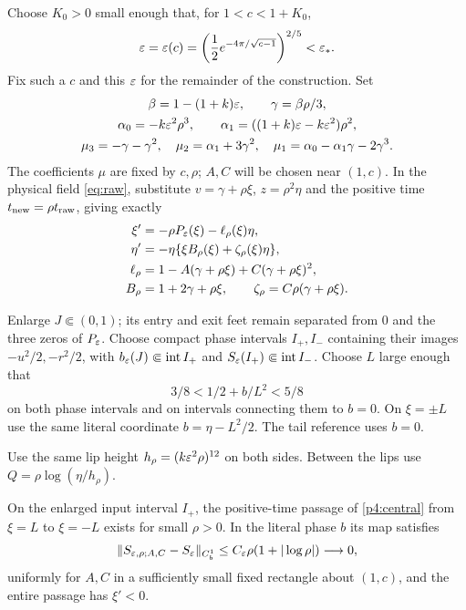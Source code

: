 Choose $K_0>0$ small enough that, for $1<c<1+K_0$,
\begin{equation}\label{p4:epsilon-c}
 \varepsilon=\varepsilon(c)=
 \left(\frac12e^{-4\pi/\sqrt{c-1}}\right)^{2/5}<\varepsilon_*.
\end{equation}
Fix such a $c$ and this $\varepsilon$ for the remainder of the construction.
Set
\begin{equation}\label{p4:path}
\begin{gathered}
 \beta=1-(1+k)\varepsilon,\qquad \gamma=\beta\rho/3,\\
 \alpha_0=-k\varepsilon^2\rho^3,\qquad
 \alpha_1=((1+k)\varepsilon-k\varepsilon^2)\rho^2,\\
 \mu_3=-\gamma-\gamma^2,\quad
 \mu_2=\alpha_1+3\gamma^2,\quad
 \mu_1=\alpha_0-\alpha_1\gamma-2\gamma^3.
\end{gathered}
\end{equation}
The coefficients $\mu$ are fixed by $c,\rho$; $A,C$ will be chosen
near $(1,c)$. In the physical field \eqref{eq:raw}, substitute
$v=\gamma+\rho\xi$, $z=\rho^2\eta$ and the positive time
$t_{\rm new}=\rho t_{\rm raw}$, giving exactly
\begin{equation}\label{p4:central}
\begin{split}
 \xi'&=-\rho P_\varepsilon(\xi)-\ell_\rho(\xi)\eta,\\
 \eta'&=-\eta\{\xi B_\rho(\xi)+\zeta_\rho(\xi)\eta\},\\
 \ell_\rho&=1-A(\gamma+\rho\xi)+C(\gamma+\rho\xi)^2,\\
 B_\rho&=1+2\gamma+\rho\xi,\qquad
 \zeta_\rho=C\rho(\gamma+\rho\xi).
\end{split}
\end{equation}

Enlarge $J\Subset(0,1)$; its entry and exit feet remain separated from
$0$ and the three zeros of $P_\varepsilon$. Choose compact phase intervals $I_+,I_-$
containing their images $-u^2/2,-r^2/2$, with
$b_\varepsilon(J)\Subset\operatorname{int}I_+$ and
$S_\varepsilon(I_+)\Subset\operatorname{int}I_-$.
Choose $L$ large enough that
\begin{equation}\label{p4:L-window}
 3/8<1/2+b/L^2<5/8
\end{equation}
on both phase intervals and on intervals connecting them to $b=0$.
On $\xi=\pm L$ use the same literal coordinate $b=\eta-L^2/2$.
The tail reference uses $b=0$.

Use the same lip height $h_\rho=(k\varepsilon^2\rho)^{12}$ on both sides.
Between the lips use $Q=\rho\log(\eta/h_\rho)$.

\begin{lemma}\label{p4:core}
On the enlarged input interval $I_+$, the positive-time passage
of \eqref{p4:central} from $\xi=L$ to $\xi=-L$ exists for small
$\rho>0$. In the literal phase $b$ its map satisfies
\begin{equation}\label{p4:core-limit}
 \|S_{\varepsilon,\rho;A,C}-S_\varepsilon\|_{C^1_b}
 \le C_\varepsilon\rho(1+|\log\rho|)\longrightarrow0,
\end{equation}
uniformly for $A,C$ in a sufficiently small fixed rectangle about
$(1,c)$, and the entire passage has $\xi'<0$.
\end{lemma}

